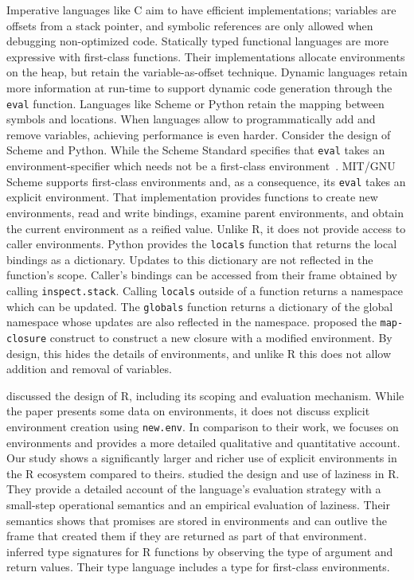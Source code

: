 \documentclass[sigplan,screen]{acmart}
\renewcommand{\c}[1]{\lstinline |#1|\xspace}
\begin{document}
Imperative languages like C aim to have efficient implementations; variables are
offsets from a stack pointer, and symbolic references are only allowed when
debugging non-optimized code. Statically typed functional languages are more
expressive with first-class functions. Their implementations allocate
environments on the heap, but retain the variable-as-offset technique. Dynamic
languages retain more information at run-time to support dynamic code generation
through the \c{eval} function. Languages like Scheme or Python retain the
mapping between symbols and locations. When languages allow to programmatically
add and remove variables, achieving performance is even harder. Consider the
design of Scheme and Python. While the Scheme Standard specifies that
\c{eval} takes an environment-specifier which needs not be a first-class
environment~\cite{SchemeR5RS}. MIT/GNU Scheme supports first-class environments
and, as a consequence, its \c{eval} takes an explicit environment. That
implementation provides functions to create new environments, read and write
bindings, examine parent environments, and obtain the current environment as a
reified value. Unlike R, it does not provide access to caller environments.
Python provides the \c{locals} function that returns the local bindings as a
dictionary. Updates to this dictionary are not reflected in the function's
scope. Caller's bindings can be accessed from their frame obtained by calling
\c{inspect.stack}. Calling \c{locals} outside of a function returns a
namespace which can be updated. The \c{globals} function returns a dictionary
of the global namespace whose updates are also reflected in the namespace.
\citet{Siskind07} proposed the \c{map-closure} construct to construct a new
closure with a modified environment. By design, this hides the details of
environments, and unlike R this does not allow addition and removal of variables.

\citet{ecoop12} discussed the design of R, including its scoping and evaluation
mechanism. While the paper presents some data on environments, it does not
discuss explicit environment creation using \c{new.env}. In comparison to
their work, we focuses on environments and provides a more detailed qualitative
and quantitative account. Our study shows a significantly larger and richer use
of explicit environments in the R ecosystem compared to theirs.
\citet{oopsla19b} studied the design and use of laziness in R. They provide a
detailed account of the language’s evaluation strategy with a small-step
operational semantics and an empirical evaluation of laziness. Their semantics
shows that promises are stored in environments and can outlive the frame that
created them if they are returned as part of that environment. \citet{oopsla20b}
inferred type signatures for R functions by observing the type of argument and
return values. Their type language includes a type for first-class environments.
\end{document}
